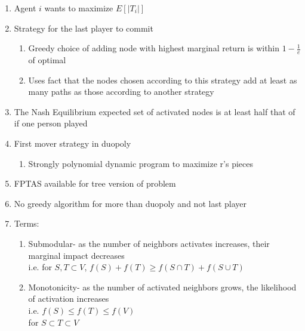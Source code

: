 \documentclass[11pt]{article}
\begin{document}
\begin{enumerate}

    \item Agent $i$ wants to maximize $E[|T_{i}|]$
    \item Strategy for the last player to commit
    \begin{enumerate}
    
        \item Greedy choice of adding node with highest 
        marginal return is within $1-\frac{1}{e}$ of optimal
        
        \item Uses fact that the nodes chosen according to this strategy add at least as many paths as those according to another strategy
        
    \end{enumerate}
    
    \item The Nash Equilibrium expected set of activated nodes is at least half that of if one person played
    
    \item First mover strategy in duopoly
    \begin{enumerate}
        \item Strongly polynomial dynamic program to maximize r's pieces
    \end{enumerate}
    
    \item FPTAS available for tree version of problem
    
    \item No greedy algorithm for more than duopoly and not last player
    
    \item Terms: 
    \begin{enumerate}
    
    \item Submodular- as the number of neighbors activates increases, their marginal impact decreases
    \\ i.e. for $S,T \subset V$, $f(S) + f(T) \geq f(S \cap T) + f(S \cup T)$
    
    \item Monotonicity- as the number of activated neighbors grows, the likelihood of activation increases
    \\ i.e. $f(S) \leq f(T) \leq f(V)$ \\ for $S \subset T \subset V$
    
    \end{enumerate}
    
\end{enumerate}
\end{document}
